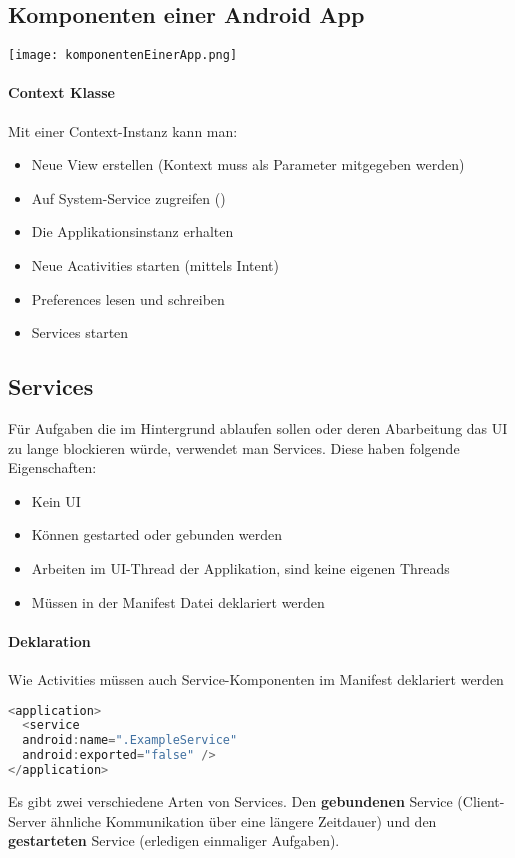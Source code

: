 \subsection{Komponenten einer Android App}
\texttt{[image: komponentenEinerApp.png]}
\paragraph{Context Klasse} Mit einer Context-Instanz kann man:
\begin{itemize}
\item Neue View erstellen (Kontext muss als Parameter mitgegeben werden)
\item Auf System-Service zugreifen ()
\item Die Applikationsinstanz erhalten
\item Neue Acativities starten (mittels Intent)
\item Preferences lesen und schreiben
\item Services starten
\end{itemize}
\subsection{Services}
Für Aufgaben die im Hintergrund ablaufen sollen oder deren Abarbeitung das UI zu lange blockieren würde, verwendet man Services. Diese haben folgende Eigenschaften:
\begin{itemize}
\item Kein UI
\item Können gestarted oder gebunden werden
\item Arbeiten im UI-Thread der Applikation, sind keine eigenen Threads
\item Müssen in der Manifest Datei deklariert werden
\end{itemize}
\paragraph{Deklaration} Wie Activities müssen auch Service-Komponenten im Manifest deklariert werden
\begin{lstlisting}[language=java]
<application>
  <service 
  android:name=".ExampleService"
  android:exported="false" />
</application>
\end{lstlisting}
Es gibt zwei verschiedene Arten von Services. Den \textbf{gebundenen} Service (Client-Server ähnliche Kommunikation über eine längere Zeitdauer) und den \textbf{gestarteten} Service (erledigen einmaliger Aufgaben).
